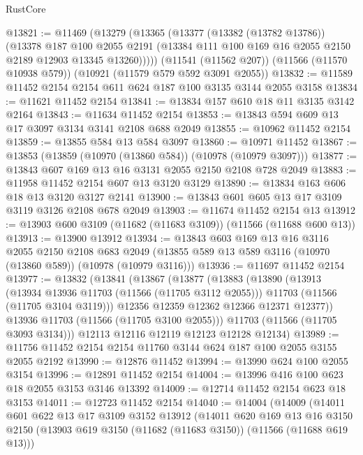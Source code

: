 \begin{lexlean}{RustCore}
\begin{coremodule}
@13821 := @11469
    (@13279
      (@13365
        (@13377
          (@13382 (@13782 @13786))
          (@13378
            @187
            @100
            @2055
            @2191
            (@13384 @111 @100 @169 @16 @2055 @2150 @2189 @12903 @13345 @13260)))))
    (@11541 (@11562 @207))
    (@11566 (@11570 @10938 @579))
    (@10921 (@11579 @579 @592 @3091 @2055))
@13832 := @11589 @11452 @2154 @2154 @611 @624 @187 @100 @3135 @3144 @2055 @3158
@13834 := @11621 @11452 @2154
@13841 := @13834 @157 @610 @18 @11 @3135 @3142 @2164
@13843 := @11634 @11452 @2154
@13853 := @13843 @594 @609 @13 @17 @3097 @3134 @3141 @2108 @688 @2049
@13855 := @10962 @11452 @2154
@13859 := @13855 @584 @13 @584 @3097
@13860 := @10971 @11452
@13867 := @13853 (@13859 (@10970 (@13860 @584)) (@10978 (@10979 @3097)))
@13877 := @13843 @607 @169 @13 @16 @3131 @2055 @2150 @2108 @728 @2049
@13883 := @11958 @11452 @2154 @607 @13 @3120 @3129
@13890 := @13834 @163 @606 @18 @13 @3120 @3127 @2141
@13900 := @13843 @601 @605 @13 @17 @3109 @3119 @3126 @2108 @678 @2049
@13903 := @11674 @11452 @2154 @13
@13912 := @13903 @600 @3109 (@11682 (@11683 @3109)) (@11566 (@11688 @600 @13))
@13913 := @13900 @13912
@13934 := @13843
    @603
    @169
    @13
    @16
    @3116
    @2055
    @2150
    @2108
    @683
    @2049
    (@13855 @589 @13 @589 @3116 (@10970 (@13860 @589)) (@10978 (@10979 @3116)))
@13936 := @11697 @11452 @2154
@13977 := @13832
    (@13841
      (@13867
        (@13877
          (@13883
            (@13890
              (@13913
                (@13934 @13936 @11703 (@11566 (@11705 @3112 @2055)))
                @11703
                (@11566 (@11705 @3104 @3119)))
              @12356
              @12359
              @12362
              @12366
              @12371
              @12377))
          @13936
          @11703
          (@11566 (@11705 @3100 @2055)))
        @11703
        (@11566 (@11705 @3093 @3134)))
      @12113
      @12116
      @12119
      @12123
      @12128
      @12134)
@13989 := @11756 @11452 @2154 @2154 @11760 @3144 @624 @187 @100 @2055 @3155 @2055 @2192
@13990 := @12876 @11452
@13994 := @13990 @624 @100 @2055 @3154
@13996 := @12891 @11452 @2154
@14004 := @13996 @416 @100 @623 @18 @2055 @3153 @3146 @13392
@14009 := @12714 @11452 @2154 @623 @18 @3153
@14011 := @12723 @11452 @2154
@14040 := @14004
    (@14009
      (@14011
        @601
        @622
        @13
        @17
        @3109
        @3152
        @13912
        (@14011
          @620
          @169
          @13
          @16
          @3150
          @2150
          (@13903 @619 @3150 (@11682 (@11683 @3150)) (@11566 (@11688 @619 @13)))

\end{coremodule}
\end{lexlean}
